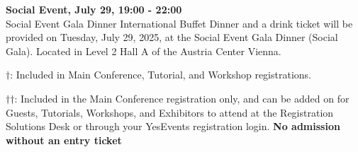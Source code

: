 \textbf{Social Event, July 29, 19:00 - 22:00}\\

\hspace{1cm} Social Event Gala Dinner International Buffet Dinner and a drink ticket will be provided on Tuesday, July 29, 2025, at the Social Event Gala Dinner (Social Gala). Located in Level 2 Hall A of the Austria Center Vienna.

\vspace{4em}

$\dagger$: Included in Main Conference, Tutorial, and Workshop registrations.

$\dagger$$\dagger$: Included in the Main Conference registration only, and can be added on for Guests, Tutorials, Workshops, and Exhibitors to attend at the Registration Solutions Desk or through your YesEvents registration login. \textbf{No admission without an entry ticket}
